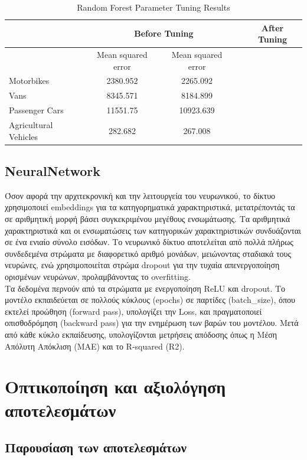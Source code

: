 \documentclass{llncs}
\begin{document}
\begin{table}[h!]
    \centering
    \begin{tabular}{lccc|ccc}
        \hline
        & \multicolumn{3}{c}{Before Tuning} & \multicolumn{3}{c}{After Tuning} \\
        \hline
        & Mean squared error & Mean squared error \\
        \hline
        Motorbikes & 2380.952 & 2265.092 \\
        Vans & 8345.571 &  8184.899 \\
        Passenger Cars & 11551.75  & 10923.639 \\
        Agricultural Vehicles & 282.682  & 267.008 \\
        \hline
    \end{tabular}
    \caption{Random Forest Parameter Tuning Results}
\end{table}

\subsection{NeuralNetwork}

Όσον αφορά την αρχιτεκρονική και την λειτουργεία του νευρωνικού,
το δίκτυο χρησιμοποιεί embeddings για τα κατηγορηματικά χαρακτηριστικά, μετατρέποντάς τα σε αριθμητική μορφή βάσει συγκεκριμένου μεγέθους ενσωμάτωσης.
Τα αριθμητικά χαρακτηριστικά και οι ενσωματώσεις των κατηγορικών χαρακτηριστικών συνδυάζονται σε ένα ενιαίο σύνολο εισόδων. Το νευρωνικό δίκτυο αποτελείται από πολλά πλήρως συνδεδεμένα στρώματα 
με διαφορετικό αριθμό μονάδων, μειώνοντας σταδιακά τους νευρώνες, ενώ χρησιμοποιείται στρώμα dropout για την τυχαία απενεργοποίηση ορισμένων νευρώνων, προλαμβάνοντας το overfitting.\\
Τα δεδομένα περνούν από τα στρώματα με ενεργοποίηση ReLU και dropout. Το μοντέλο εκπαιδεύεται σε πολλούς κύκλους (epochs) σε παρτίδες (batch\_size), όπου εκτελεί προώθηση (forward pass), υπολογίζει την Loss, 
και πραγματοποιεί οπισθοδρόμηση (backward pass) για την ενημέρωση των βαρών του μοντέλου. Μετά από κάθε κύκλο εκπαίδευσης, υπολογίζονται μετρήσεις απόδοσης όπως η Μέση Απόλυτη Απόκλιση (MAE) και το R-squared (R2).

\section{Oπτικοποίηση και αξιολόγηση αποτελεσμάτων}

\subsection{Παρουσίαση των αποτελεσμάτων}
\end{document}

